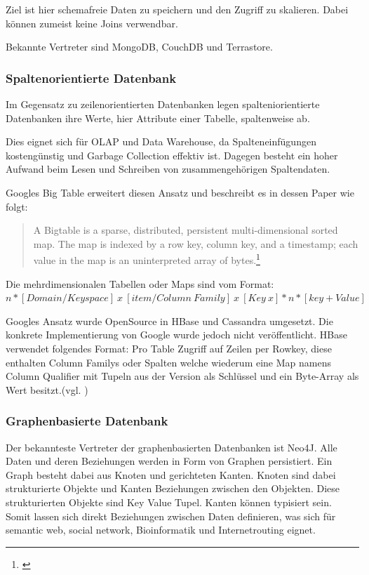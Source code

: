 Ziel ist hier schemafreie Daten zu speichern und den Zugriff zu skalieren.
Dabei können zumeist keine Joins verwendbar.

Bekannte Vertreter sind MongoDB, CouchDB und Terrastore.

\subsubsection{Spaltenorientierte Datenbank}

Im Gegensatz zu zeilenorientierten Datenbanken legen spalteniorientierte Datenbanken ihre Werte, hier Attribute einer Tabelle, spaltenweise ab.

Dies eignet sich für OLAP und Data Warehouse, da Spalteneinfügungen kostengünstig und Garbage Collection effektiv ist.
Dagegen besteht ein hoher Aufwand beim Lesen und Schreiben von zusammengehörigen Spaltendaten.

Googles Big Table erweitert diesen Ansatz und beschreibt es in dessen Paper wie folgt:
\begin{quote}
A  Bigtable  is  a  sparse,  distributed,  persistent  multi-dimensional sorted map. The map is indexed by a row key, column key, and a timestamp; each value in the map is an uninterpreted array of bytes.\footnote{\cite[S.1]{paper:bigtable}}
\end{quote}
Die mehrdimensionalen Tabellen oder Maps sind vom Format:\\
$n*[Domain / Keyspace]\ x\ [item / Column\ Family]\ x\ [Key\ x]*n*[key+Value]$

Googles Ansatz wurde OpenSource in HBase und Cassandra umgesetzt. Die konkrete Implementierung von Google wurde jedoch nicht veröffentlicht.
HBase verwendet folgendes Format: Pro Table Zugriff auf Zeilen per Rowkey, diese enthalten Column Familys oder Spalten welche wiederum eine Map namens Column Qualifier mit Tupeln aus der Version als Schlüssel und ein Byte-Array als Wert besitzt.(vgl. \cite[S.13]{ba:dan})

\subsubsection{Graphenbasierte Datenbank}

Der bekannteste Vertreter der graphenbasierten Datenbanken ist Neo4J.
Alle Daten und deren Beziehungen werden in Form von Graphen persistiert.
Ein Graph besteht dabei aus Knoten und gerichteten Kanten.
Knoten sind dabei strukturierte Objekte und Kanten Beziehungen zwischen den Objekten.
Diese strukturierten Objekte sind Key Value Tupel.
Kanten können typisiert sein.
Somit lassen sich direkt Beziehungen zwischen Daten definieren, was sich für semantic web, social network, Bioinformatik und Internetrouting eignet.

